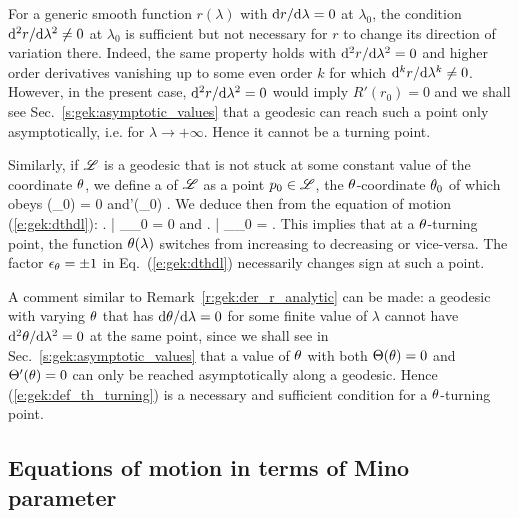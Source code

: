 \begin{remark} \label{r:gek:der_r_analytic}
For a generic smooth function $r(\lambda)$ with $\mathrm{d} r/\mathrm{d} \lambda=0$ at
$\lambda_0$, the condition $\mathrm{d}^2 r/\mathrm{d}\lambda^2\neq 0$ at $\lambda_0$
is sufficient but not necessary for $r$ to change its direction of variation there.
Indeed, the same property holds with $\mathrm{d}^2 r/\mathrm{d}\lambda^2= 0$ and higher order derivatives vanishing up to some even order $k$ for which
$\mathrm{d}^k r/\mathrm{d}\lambda^k\neq 0$. However, in the present case,
$\mathrm{d}^2 r/\mathrm{d}\lambda^2=0$ would imply $R'(r_0)=0$ and we shall see
Sec.~\ref{s:gek:asymptotic_values} that a geodesic can reach such a point only asymptotically,
i.e. for $\lambda\to +\infty$. Hence it cannot be a turning point.
\end{remark}


Similarly, if $\mathscr{L}$ is a geodesic that is not stuck at some constant value of the
coordinate $\theta$, we define a  of $\mathscr{L}$ as a point $p_0\in\mathscr{L}$, the
$\theta$-coordinate $\theta_0$ of which obeys
\be \label{e:gek:def_th_turning}
    \Theta(\th_0) = 0 \quad\mbox{and}\quad \Theta'(\theta_0)  .
\ee
We deduce then from the equation of motion (\ref{e:gek:dthdl}):
\be \label{e:gek:der_th_turning}
   \left. \derd{\th}{\lambda} \right| _{\lambda_0} = 0
   \quad\mbox{and}\quad
   \left.  \right| _{\lambda_0} =   .
\ee
This implies that at a $\theta$-turning point, the function $\theta(\lambda)$
switches from increasing to decreasing or vice-versa. The factor $\epsilon_\theta=\pm 1$ in Eq.~(\ref{e:gek:dthdl}) necessarily
changes sign at such a point.

\begin{remark}
A comment similar to Remark~\ref{r:gek:der_r_analytic} can be made:
a geodesic with varying $\theta$ that has $\mathrm{d}\theta/\mathrm{d}\lambda = 0$ for some finite
value of $\lambda$
cannot have $\mathrm{d}^2\theta/\mathrm{d}\lambda^2 = 0$ at the same point, since we shall see
in Sec.~\ref{s:gek:asymptotic_values}
that a value of $\theta$ with both $\Theta(\theta)=0$
and $\Theta'(\theta)=0$ can only be reached asymptotically along a geodesic.
Hence (\ref{e:gek:def_th_turning})
is a necessary and sufficient condition for a $\theta$-turning point.
\end{remark}


\subsection{Equations of motion in terms of Mino parameter} \label{s:gek:Mino_time}

